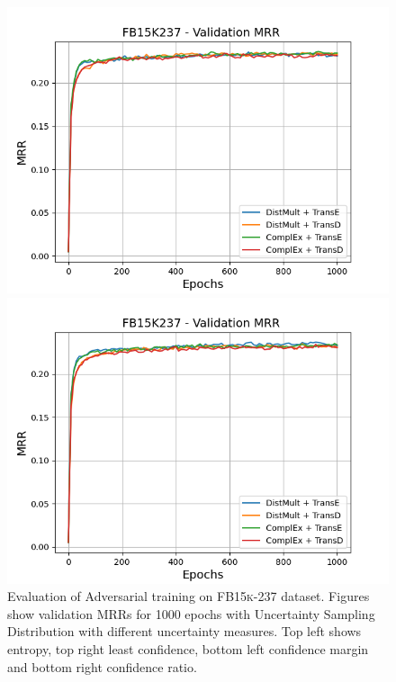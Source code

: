 \begin{figure}[H]
\begin{minipage}{.45\textwidth}
      \includegraphics[width=0.9\linewidth]{figures/results/gan_train/not_pretrained/uncertainty/max_distribution/confidence_margin/fb15k237/uncertainty_fb15k237_mrrs.png}
    \end{minipage}%
    \begin{minipage}{.45\textwidth}
      \centering
      \includegraphics[width=0.9\linewidth]{figures/results/gan_train/not_pretrained/uncertainty/max_distribution/confidence_ratio/fb15k237/uncertainty_fb15k237_mrrs.png}
    \end{minipage}%
    \caption{Evaluation of Adversarial training on \textsc{FB15k-237} dataset. 
    Figures show validation MRRs for 1000 epochs with Uncertainty Sampling Distribution with different uncertainty measures.
    Top left shows entropy, top right least confidence, 
    bottom left confidence margin and bottom right confidence ratio.}
    \label{fig:advtrain_measures_fb15k237}
\end{figure}


